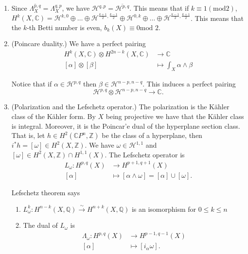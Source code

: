 \begin{enumerate}
\item Since
$\overline{\Lambda^{p,q}_X}=\Lambda^{q,p}_X$,
we have
$\mathcal{H}^{q,p}=\overline{\mathcal{H}^{p,
q}}$.
This means that if $k \equiv 1 (\text{mod
}2)$,
$H^k(X,\mathbb{C})=\mathcal{H}^{k,0} \oplus …
\oplus
\mathcal{H}^{\frac{k+1}{2},\frac{k-1}{2}}
\oplus \mathcal{H}^{0,k}\oplus … \oplus
\mathcal{H}^{\frac{k-1}{2},\frac{k+1}{2}}$.
This means that the $k$-th Betti number is
even,
$b_k(X)\equiv 0 \text{mod }2$.

\item (Poincare duality.) We have a perfect
pairing
$$
\begin{aligned}
H^k(X,\mathbb{C}) \otimes
H^{2n-k}(X,\mathbb{C})
&\longrightarrow \mathbb{C} \\
[\alpha]\otimes[\beta] &\longmapsto
\int_X\alpha\wedge\beta
\end{aligned}
$$

\noindent
Notice that if
$\alpha \in \mathcal{H}^{p,q}$
then $\beta \in \mathcal{H}^{n-p,n-q}$.
This induces a perfect pairing
$$
\mathcal{H}^{p,q}\otimes\mathcal{H}^{n-p,n-q}
\to \mathbb{C}.
$$

\item (Polarization and the Lefschetz
operator.)
The polarization is the Kähler class of the
Kähler form.
By $X$ being projective we have that the
Kähler class is integral.
Moreover, it is the Poincar'e dual of the
hyperplane section class.
That is, let $h \in
H^2(\mathbb{C}P^n,\mathbb{Z})$
be the class of a hyperplane,
then $i^*h=[\omega] \in H^2(X,\mathbb{Z})$.
We have $\omega \in \mathcal{H}^{1,1}$
and $[\omega]\in H^2(X,\mathbb{Z}) \cap
H^{1,1}(X)$.
The Lefschetz operator is
$$
\begin{aligned}
L_\omega: H^{p,q}(X) &\longrightarrow
H^{p+1,q+1}(X) \\
[\alpha] &\longmapsto
[\alpha\wedge\omega]=[\alpha]\cup [\omega].
\end{aligned}
$$

\noindent
Lefschetz theorem says
\begin{enumerate}
\item
$L_\omega^k:H^{n-k}(X,\mathbb{Q})
\xrightarrow{\sim}
H^{n+k}(X,\mathbb{Q})$
is an isomorphism for $0\leq k\leq n$

\item The dual of $L_\omega$ is
$$
\begin{aligned}
\Lambda_\omega: H^{p,q}(X) &\longrightarrow
H^{p-1,q-1}(X) \\
[\alpha] &\longmapsto [i_\alpha \omega].
\end{aligned}
$$


\end{enumerate}
\end{enumerate}

